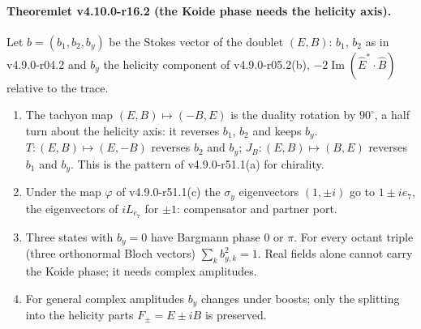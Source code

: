 \paragraph{Theoremlet v4.10.0-r16.2 (the Koide phase needs the helicity axis).}
Let \(b=(b_1,b_2,b_y)\) be the Stokes vector of the doublet \((E,B)\): \(b_1\), \(b_2\) as in v4.9.0-r04.2 and \(b_y\) the helicity
component of v4.9.0-r05.2(b), \(-2\operatorname{Im}(\hat E^*\cdot\hat B)\) relative to the trace.
\begin{enumerate}[leftmargin=2em]
\item[(a)] The tachyon map \((E,B)\mapsto(-B,E)\) is the duality rotation by \(90^\circ\), a half turn about the helicity axis: it
reverses \(b_1\), \(b_2\) and keeps \(b_y\).  \(T\colon(E,B)\mapsto(E,-B)\) reverses \(b_2\) and \(b_y\); \(J_B\colon(E,B)\mapsto(B,E)\)
reverses \(b_1\) and \(b_y\).  This is the pattern of v4.9.0-r51.1(a) for chirality.
\item[(b)] Under the map \(\varphi\) of v4.9.0-r51.1(c) the \(\sigma_y\) eigenvectors \((1,\pm i)\) go to \(1\pm ie_7\), the
eigenvectors of \(iL_{e_7}\) for \(\pm1\): compensator and partner port.
\item[(c)] Three states with \(b_y=0\) have Bargmann phase \(0\) or \(\pi\).  For every octant triple (three orthonormal Bloch
vectors) \(\sum_k b_{y,k}^2=1\).  Real fields alone cannot carry the Koide phase; it needs complex amplitudes.
\item[(d)] For general complex amplitudes \(b_y\) changes under boosts; only the splitting into the helicity parts
\(F_\pm=E\pm iB\) is preserved.
\end{enumerate}

